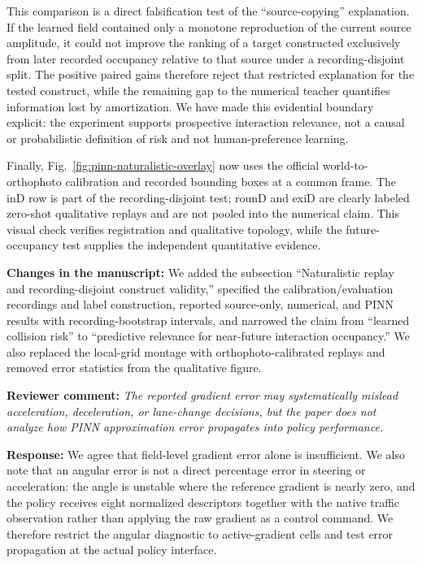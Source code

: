 This comparison is a direct falsification test of the ``source-copying''
explanation. If the learned field contained only a monotone reproduction of
the current source amplitude, it could not improve the ranking of a target
constructed exclusively from later recorded occupancy relative to that source
under a recording-disjoint split. The positive paired gains therefore reject
that restricted explanation for the tested construct, while the remaining gap
to the numerical teacher quantifies information lost by amortization. We have
made this evidential boundary explicit: the experiment supports prospective
interaction relevance, not a causal or probabilistic definition of risk and
not human-preference learning.

Finally, Fig.~\ref{fig:pinn-naturalistic-overlay} now uses the official
world-to-orthophoto calibration and recorded bounding boxes at a common frame.
The inD row is part of the recording-disjoint test; rounD and exiD are clearly
labeled zero-shot qualitative replays and are not pooled into the numerical
claim. This visual check verifies registration and qualitative topology, while
the future-occupancy test supplies the independent quantitative evidence.

\noindent\textbf{Changes in the manuscript:}
We added the subsection ``Naturalistic replay and recording-disjoint
construct validity,'' specified the calibration/evaluation recordings and
label construction, reported source-only, numerical, and PINN results with
recording-bootstrap intervals, and narrowed the claim from ``learned collision
risk'' to ``predictive relevance for near-future interaction occupancy.'' We
also replaced the local-grid montage with orthophoto-calibrated replays and
removed error statistics from the qualitative figure.

\medskip
\noindent\textbf{Reviewer comment:}
\emph{The reported gradient error may systematically mislead acceleration,
deceleration, or lane-change decisions, but the paper does not analyze how PINN
approximation error propagates into policy performance.}

\noindent\textbf{Response:}
We agree that field-level gradient error alone is insufficient. We also note
that an angular error is not a direct percentage error in steering or
acceleration: the angle is unstable where the reference gradient is nearly
zero, and the policy receives eight normalized descriptors together with the
native traffic observation rather than applying the raw gradient as a control
command. We therefore restrict the angular diagnostic to active-gradient
cells and test error propagation at the actual policy interface.

